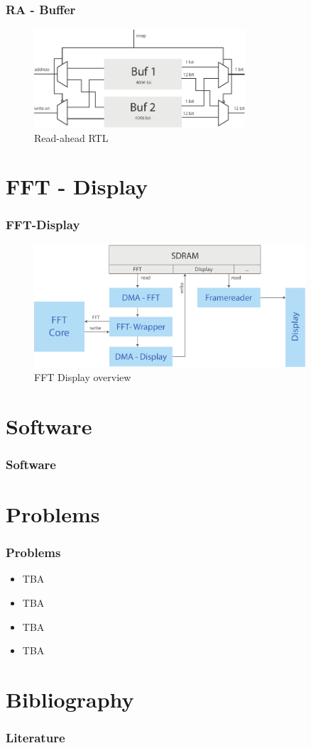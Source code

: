 \documentclass{beamer}
\begin{document}
\begin{frame}\frametitle{RA - Buffer}
    \begin{figure}[hp]
      \centering
      \includegraphics[width=0.7\textwidth]{pictures/read_ahead_gatter}
      \caption{Read-ahead RTL}
      \label{fig:fft_display_struct}
    \end{figure}
\end{frame}

\section{FFT - Display}
\begin{frame}\frametitle{FFT-Display}
    \begin{figure}[hp]
      \centering
      \includegraphics[width=0.9\textwidth]{pictures/fft_display}
      \caption{FFT Display overview}
      \label{fig:fft_display_struct}
    \end{figure}
\end{frame}
\section{Software}
\begin{frame}\frametitle{Software}
	
\end{frame}

\section{Problems}
\begin{frame}\frametitle{Problems}
\begin{itemize}
	\item {TBA} 
	\item {TBA}
	\item {TBA}
	\item {TBA}
\end{itemize}
\end{frame}
      
\section{Bibliography}
\begin{frame}[allowframebreaks] \frametitle{Literature} 


\end{frame}
\end{document}

